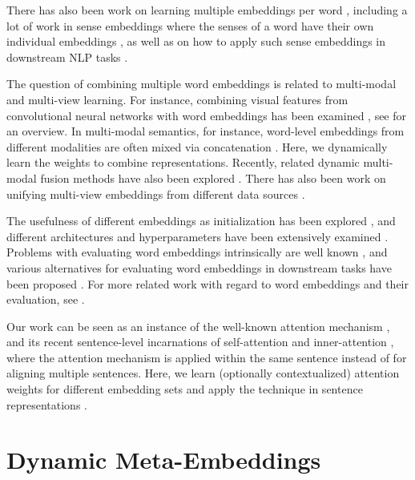 \documentclass[11pt,a4paper]{article}
\begin{document}
There has also been work on learning multiple embeddings per word \cite{Chen:2014emnlp,Neelakantan:2015arxiv,Vu:2016naacl}, including a lot of work in sense embeddings where the senses of a word have their own individual embeddings \cite{Iacobacci:2015acl,Qiu:2016emnlp}, as well as on how to apply such sense embeddings in downstream NLP tasks \cite{Pilehvar:2017arxiv}.

The question of combining multiple word embeddings is related to multi-modal and multi-view learning. For instance, combining visual features from convolutional neural networks with word embeddings has been examined \cite{Kiela:2014emnlp,Lazaridou:2015arxiv}, see  for an overview. In multi-modal semantics, for instance, word-level embeddings from different modalities are often mixed via concatenation  \cite{Bruni:2014jair}. Here, we dynamically learn the weights to combine representations. Recently, related dynamic multi-modal fusion methods have also been explored \cite{Wang:2018arxiv,Kiros:2018acl}. There has also been work on unifying multi-view embeddings from different data sources \cite{Luo:2014}.

The usefulness of different embeddings as initialization has been explored \cite{Kocmi:2017arxiv}, and different architectures and hyperparameters have been extensively examined \cite{Levy:2015tacl}. Problems with evaluating word embeddings intrinsically are well known \cite{Faruqui:2016arxiv}, and various alternatives for evaluating word embeddings in downstream tasks have been proposed \cite[e.g.,][]{Tsvetkov:2015emnlp,Schnabel:2015emnlp,Ettinger:2016repeval}. For more related work with regard to word embeddings and their evaluation, see .

Our work can be seen as an instance of the well-known attention mechanism \cite{Bahdanau:2014arxiv}, and its recent sentence-level incarnations of self-attention \cite{Lin:2017arxiv} and inner-attention \cite{Cheng:2016arxiv,Liu:2016arxiv}, where the attention mechanism is applied within the same sentence instead of for aligning multiple sentences. Here, we learn (optionally contextualized) attention weights for different embedding sets and apply the technique in sentence representations \cite{Kiros:2015nips,Wieting:2015arxiv,Hill:2016arxiv,Conneau:2017emnlp}.

\section{Dynamic Meta-Embeddings}
\end{document}
